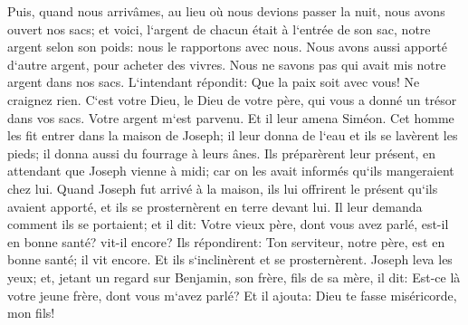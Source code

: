 \verse Puis, quand nous arrivâmes, au lieu où nous devions passer la nuit, nous avons ouvert nos sacs; et voici, l`argent de chacun était à l`entrée de son sac, notre argent selon son poids: nous le rapportons avec nous. 
\verse Nous avons aussi apporté d`autre argent, pour acheter des vivres. Nous ne savons pas qui avait mis notre argent dans nos sacs. 
\verse L`intendant répondit: Que la paix soit avec vous! Ne craignez rien. C`est votre Dieu, le Dieu de votre père, qui vous a donné un trésor dans vos sacs. Votre argent m`est parvenu. Et il leur amena Siméon. 
\verse Cet homme les fit entrer dans la maison de Joseph; il leur donna de l`eau et ils se lavèrent les pieds; il donna aussi du fourrage à leurs ânes. 
\verse Ils préparèrent leur présent, en attendant que Joseph vienne à midi; car on les avait informés qu`ils mangeraient chez lui. 
\verse Quand Joseph fut arrivé à la maison, ils lui offrirent le présent qu`ils avaient apporté, et ils se prosternèrent en terre devant lui. 
\verse Il leur demanda comment ils se portaient; et il dit: Votre vieux père, dont vous avez parlé, est-il en bonne santé? vit-il encore? 
\verse Ils répondirent: Ton serviteur, notre père, est en bonne santé; il vit encore. Et ils s`inclinèrent et se prosternèrent. 
\verse Joseph leva les yeux; et, jetant un regard sur Benjamin, son frère, fils de sa mère, il dit: Est-ce là votre jeune frère, dont vous m`avez parlé? Et il ajouta: Dieu te fasse miséricorde, mon fils! 
